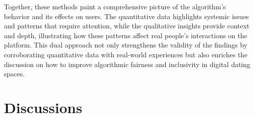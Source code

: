 Together, these methods paint a comprehensive picture of the algorithm's behavior and its effects on users. The quantitative data highlights systemic issues and patterns that require attention, while the qualitative insights provide context and depth, illustrating how these patterns affect real people's interactions on the platform. This dual approach not only strengthens the validity of the findings by corroborating quantitative data with real-world experiences but also enriches the discussion on how to improve algorithmic fairness and inclusivity in digital dating spaces.

\section{Discussions}   
